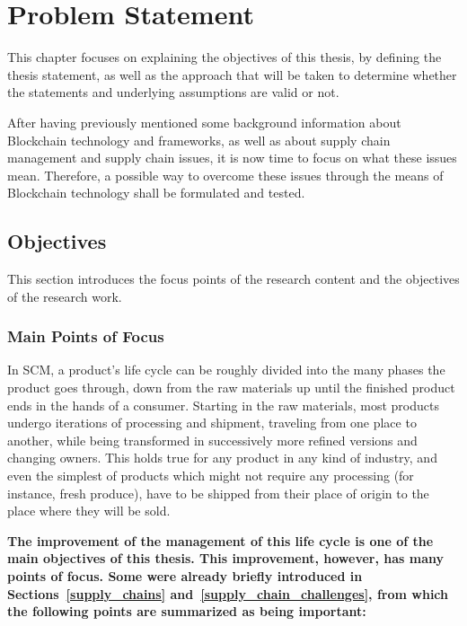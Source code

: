 \chapter{Problem Statement}
\label{chap:supply-chain-problems}
\minitoc \mtcskip \noindent 

This chapter focuses on explaining the objectives of this thesis, by defining the thesis statement, as well as the approach that will be taken to determine whether the statements and underlying assumptions are valid or not.

After having previously mentioned some background information about Blockchain technology and frameworks, as well as about supply chain management and supply chain issues, it is now time to focus on what these issues mean. Therefore, a possible way to overcome these issues through the means of Blockchain technology shall be formulated and tested.

\section{Objectives}

This section introduces the focus points of the research content and the objectives of the research work.

\subsection{Main Points of Focus}
\label{sec:points-of-focus}
In SCM, a product's life cycle can be roughly divided into the many phases the product goes through, down from the raw materials up until the finished product ends in the hands of a consumer. Starting in the raw materials, most products undergo iterations of processing and shipment, traveling from one place to another, while being transformed in successively more refined versions and changing owners. This holds true for any product in any kind of industry, and even the simplest of products which might not require any processing (for instance, fresh produce), have to be shipped from their place of origin to the place where they will be sold.


\textbf{The improvement of the management of this life cycle is one of the main objectives of this thesis. This improvement, however, has many points of focus. Some were already briefly introduced in Sections~\ref{supply_chains} and~\ref{supply_chain_challenges}, from which the following points are summarized as being important:}

